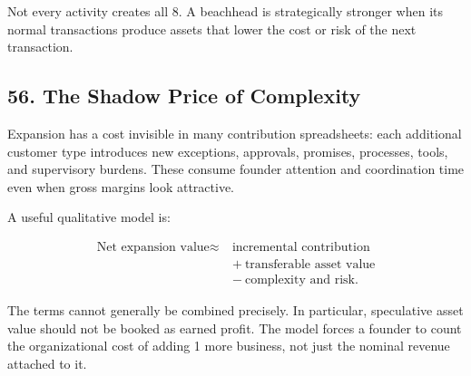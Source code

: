 Not every activity creates all 8. A beachhead is strategically stronger when its normal transactions produce assets that lower the cost or risk of the next transaction.

\subsection*{56. The Shadow Price of Complexity}

Expansion has a cost invisible in many contribution spreadsheets: each additional customer type introduces new exceptions, approvals, promises, processes, tools, and supervisory burdens. These consume founder attention and coordination time even when gross margins look attractive.

A useful qualitative model is:

\begin{equation}
\begin{aligned}
\text{Net expansion value} \approx\ &\text{incremental contribution} \\
&+\ \text{transferable asset value} \\
&-\ \text{complexity and risk}.
\end{aligned}
\end{equation}

The terms cannot generally be combined precisely. In particular, speculative asset value should not be booked as earned profit. The model forces a founder to count the organizational cost of adding 1 more business, not just the nominal revenue attached to it.

